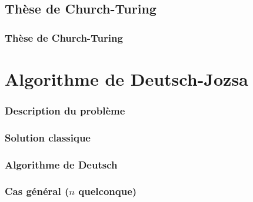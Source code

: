 \documentclass[aspectratio=169]{beamer}
\begin{document}
\subsection{Thèse de Church-Turing}
\begin{frame}
    \frametitle{Thèse de Church-Turing}
\end{frame}

\section{Algorithme de Deutsch-Jozsa}
\begin{frame}
    \frametitle{Description du problème}
\end{frame}

\begin{frame}
    \frametitle{Solution classique}
\end{frame}

\begin{frame}
    \frametitle{Algorithme de Deutsch}
\end{frame}

\begin{frame}
    \frametitle{Cas général ($n$ quelconque)}
\end{frame}
\end{document}
